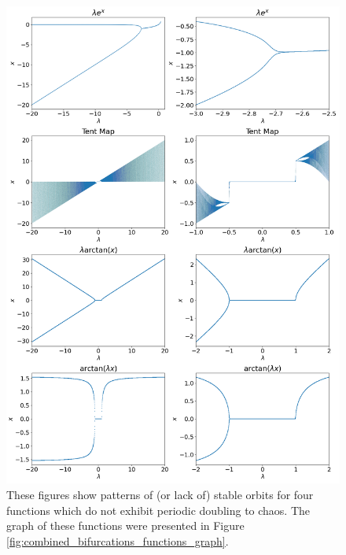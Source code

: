 \begin{figure}
	\centering
	\includegraphics[width=\textwidth]{./figures/combined_no_bifurcations.png}
	\caption{
		These figures show patterns of (or lack of) stable orbits for four functions which do not exhibit periodic doubling to chaos. 
		The graph of these functions were presented in Figure \ref{fig:combined_bifurcations_functions_graph}.
	}
	\label{fig:combined_no_bifurcations}
\end{figure}

